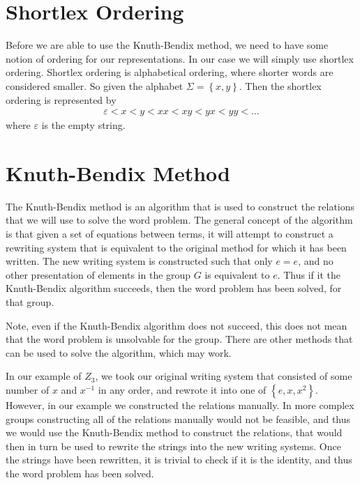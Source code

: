 \documentclass[10pt]{amsart}
\theoremstyle{definition}
\begin{document}
\section{Shortlex Ordering}%
\label{sec:shortlex_ordering}

Before we are able to use the Knuth-Bendix method, we need to have some notion
of ordering for our representations. In our case we will simply use shortlex
ordering. Shortlex ordering is alphabetical ordering, where shorter words are
considered smaller. So given the alphabet $\Sigma=\left\{x,y\right\}$. Then the
shortlex ordering is represented by
\begin{align*}
  \varepsilon<x<y<xx<xy<yx<yy<\ldots
\end{align*}
where $\varepsilon$ is the empty string.

\section{Knuth-Bendix Method}%
\label{sec:kunth_bendix_method}

The Knuth-Bendix method is an algorithm that is used to construct the relations
that we will use to solve the word problem. The general concept of the
algorithm is that given a set of equations between terms, it will attempt to
construct a rewriting system that is equivalent to the original method for
which it has been written. The new writing system is constructed such that only
$e=e$, and no other presentation of elements in the group $G$ is equivalent to
$e$. Thus if it the Knuth-Bendix algorithm succeeds, then the word problem has
been solved, for that group.

Note, even if the Knuth-Bendix algorithm does not succeed, this does not mean
that the word problem is unsolvable for the group. There are other methods that
can be used to solve the algorithm, which may work.

In our example of $Z_3$, we took our original writing system that consisted of
some number of $x$ and $x^{-1}$ in any order, and rewrote it into one of
$\left\{e, x, x^2\right\}$. However, in our example we constructed the
relations manually. In more complex groups constructing all of the relations
manually would not be feasible, and thus we would use the Knuth-Bendix method
to construct the relations, that would then in turn be used to rewrite the
strings into the new writing systems. Once the strings have been rewritten, it
is trivial to check if it is the identity, and thus the word problem has been
solved.
\end{document}
